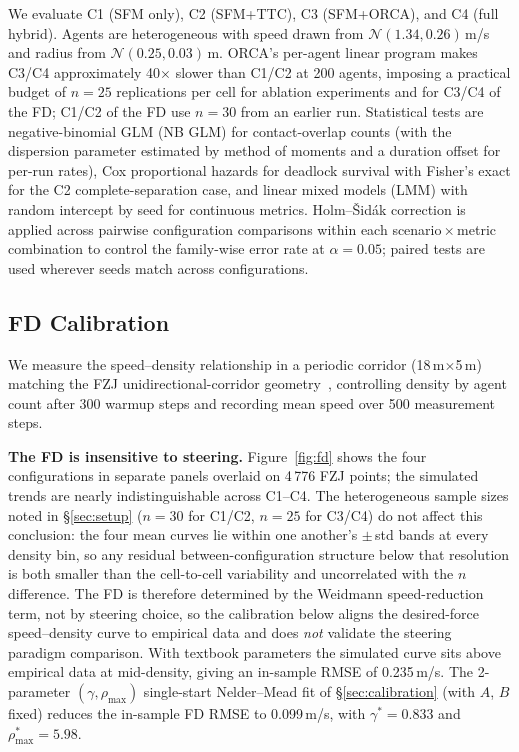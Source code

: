 \documentclass[a4paper,twoside]{article}
\begin{document}
We evaluate C1 (SFM only), C2 (SFM+TTC), C3 (SFM+ORCA), and C4 (full hybrid). Agents are heterogeneous with speed drawn from $\mathcal{N}(1.34,0.26)$\,m/s and radius from $\mathcal{N}(0.25,0.03)$\,m. ORCA's per-agent linear program makes C3/C4 approximately 40$\times$ slower than C1/C2 at 200 agents, imposing a practical budget of $n=25$ replications per cell for ablation experiments and for C3/C4 of the FD; C1/C2 of the FD use $n=30$ from an earlier run. Statistical tests are negative-binomial GLM (NB GLM) for contact-overlap counts (with the dispersion parameter estimated by method of moments and a duration offset for per-run rates), Cox proportional hazards for deadlock survival with Fisher's exact for the C2 complete-separation case, and linear mixed models (LMM) with random intercept by seed for continuous metrics. Holm--\v{S}id\'ak correction is applied across pairwise configuration comparisons within each scenario\,$\times$\,metric combination to control the family-wise error rate at $\alpha=0.05$; paired tests are used wherever seeds match across configurations.

\subsection{FD Calibration}
\label{sec:fd-validation}

We measure the speed--density relationship in a periodic corridor (18\,m$\times$5\,m) matching the FZJ unidirectional-corridor geometry~\cite{FZJ13a}, controlling density by agent count after 300 warmup steps and recording mean speed over 500 measurement steps.

\textbf{The FD is insensitive to steering.}
Figure~\ref{fig:fd} shows the four configurations in separate panels overlaid on 4\,776 FZJ points; the simulated trends are nearly indistinguishable across C1--C4. The heterogeneous sample sizes noted in \S\ref{sec:setup} ($n=30$ for C1/C2, $n=25$ for C3/C4) do not affect this conclusion: the four mean curves lie within one another's $\pm$\,std bands at every density bin, so any residual between-configuration structure below that resolution is both smaller than the cell-to-cell variability and uncorrelated with the $n$ difference. The FD is therefore determined by the Weidmann speed-reduction term, not by steering choice, so the calibration below aligns the desired-force speed--density curve to empirical data and does \emph{not} validate the steering paradigm comparison. With textbook parameters the simulated curve sits above empirical data at mid-density, giving an in-sample RMSE of 0.235\,m/s. The 2-parameter $(\gamma,\rho_{\max})$ single-start Nelder--Mead fit of \S\ref{sec:calibration} (with $A$, $B$ fixed) reduces the in-sample FD RMSE to 0.099\,m/s, with $\gamma^*=0.833$ and $\rho_{\max}^*=5.98$.
\end{document}

